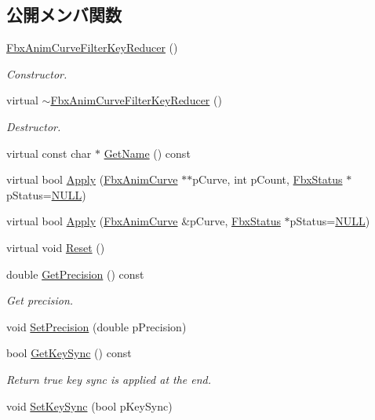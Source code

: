 \subsection*{公開メンバ関数}
\begin{DoxyCompactItemize}
\item 
\hyperlink{class_fbx_anim_curve_filter_key_reducer_ad43e77bed0728ae7cd9f24e33753f984}{Fbx\+Anim\+Curve\+Filter\+Key\+Reducer} ()
\begin{DoxyCompactList}\small\item\em Constructor. \end{DoxyCompactList}\item 
virtual \hyperlink{class_fbx_anim_curve_filter_key_reducer_a69f345185767183595a34df13ae713c2}{$\sim$\+Fbx\+Anim\+Curve\+Filter\+Key\+Reducer} ()
\begin{DoxyCompactList}\small\item\em Destructor. \end{DoxyCompactList}\item 
virtual const char $\ast$ \hyperlink{class_fbx_anim_curve_filter_key_reducer_a86d571282e550eecbf7afb0f198ce91f}{Get\+Name} () const
\item 
virtual bool \hyperlink{class_fbx_anim_curve_filter_key_reducer_a8c0c58b8f2e4272bc5f257570daf5ba1}{Apply} (\hyperlink{class_fbx_anim_curve}{Fbx\+Anim\+Curve} $\ast$$\ast$p\+Curve, int p\+Count, \hyperlink{class_fbx_status}{Fbx\+Status} $\ast$p\+Status=\hyperlink{fbxarch_8h_a070d2ce7b6bb7e5c05602aa8c308d0c4}{N\+U\+LL})
\item 
virtual bool \hyperlink{class_fbx_anim_curve_filter_key_reducer_a8b2b0d1d3eaeb8d1333be55211a75b1a}{Apply} (\hyperlink{class_fbx_anim_curve}{Fbx\+Anim\+Curve} \&p\+Curve, \hyperlink{class_fbx_status}{Fbx\+Status} $\ast$p\+Status=\hyperlink{fbxarch_8h_a070d2ce7b6bb7e5c05602aa8c308d0c4}{N\+U\+LL})
\item 
virtual void \hyperlink{class_fbx_anim_curve_filter_key_reducer_a52e9e7476a3c4e55ad7c41c978b92cd5}{Reset} ()
\item 
double \hyperlink{class_fbx_anim_curve_filter_key_reducer_abd457aef2c4da70a5a6657947f078988}{Get\+Precision} () const
\begin{DoxyCompactList}\small\item\em Get precision. \end{DoxyCompactList}\item 
void \hyperlink{class_fbx_anim_curve_filter_key_reducer_a36e172b2c259e383897828f10036e277}{Set\+Precision} (double p\+Precision)
\item 
bool \hyperlink{class_fbx_anim_curve_filter_key_reducer_a82cb456079577735e58cba071eed3a12}{Get\+Key\+Sync} () const
\begin{DoxyCompactList}\small\item\em Return {\ttfamily true} key sync is applied at the end. \end{DoxyCompactList}\item 
void \hyperlink{class_fbx_anim_curve_filter_key_reducer_adf95529fab4de5a4e3a8d3112d6ba722}{Set\+Key\+Sync} (bool p\+Key\+Sync)
\end{DoxyCompactItemize}
